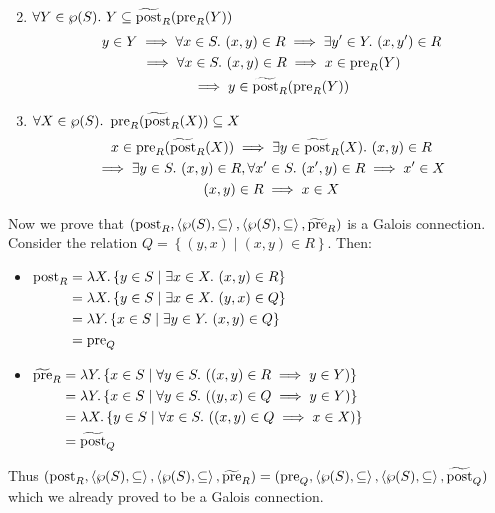\begin{exercise}
\begin{enumerate}[1.]
\begin{gather*}
        \end{gather*}
        \item $\forall Y \in \wp(S).\ Y \subseteq \widetilde{\operatorname{post}}_R(\operatorname{pre}_R(Y))$
        \begin{gather*}
            y \in Y \implies \forall x \in S.\ (x, y) \in R \implies \exists y' \in Y.\ (x, y') \in R \\
            \implies \forall x \in S.\ (x, y) \in R \implies x \in \operatorname{pre}_R(Y) \\
            \implies y \in \widetilde{\operatorname{post}}_R(\operatorname{pre}_R(Y))
        \end{gather*}
        \item $\forall X \in \wp(S).\ \pre_R(\widetilde{\post}_R(X)) \subseteq X$
        \begin{gather*}
            x \in \pre_R(\widetilde{\post}_R(X)) \implies \exists y \in \widetilde{\post}_R(X).\ (x, y) \in R \\
            \implies \exists y \in S.\ (x, y) \in R, \forall x' \in S.\ (x', y) \in R \implies x' \in X \\
            (x, y) \in R \implies x \in X
        \end{gather*}
    \end{enumerate}
    Now we prove that $(\operatorname{post}_R, \left<\wp(S), \subseteq\right>, \left<\wp(S), \subseteq\right>, \widetilde{\operatorname{pre}}_R)$ is a Galois connection. Consider the relation $Q = \left\{(y, x) \mid (x, y) \in R\right\}$. Then:
    \begin{itemize}
        \item $\!\begin{aligned}[t]
            \operatorname{post}_R
            &= \lambda X. \left\{ y \in S \mid \exists x \in X.\ (x, y) \in R \right\} \\
            &= \lambda X. \left\{ y \in S \mid \exists x \in X.\ (y, x) \in Q \right\} \\
            &= \lambda Y. \left\{ x \in S \mid \exists y \in Y.\ (x, y) \in Q \right\} \\
            &= \operatorname{pre}_Q
        \end{aligned}$
        \item $\!\begin{aligned}[t]
            \widetilde{\pre}_R
            &= \lambda Y. \left\{ x \in S \mid \forall y \in S.\ ((x, y) \in R \implies y \in Y)\right\} \\
            &= \lambda Y. \left\{ x \in S \mid \forall y \in S.\ ((y, x) \in Q \implies y \in Y)\right\} \\
            &= \lambda X. \left\{ y \in S \mid \forall x \in S.\ ((x, y) \in Q \implies x \in X)\right\} \\
            &= \widetilde{\post}_Q
        \end{aligned}$
    \end{itemize}
    Thus $(\operatorname{post}_R, \left<\wp(S), \subseteq\right>, \left<\wp(S), \subseteq\right>, \widetilde{\operatorname{pre}}_R) = (\operatorname{pre}_Q, \left<\wp(S), \subseteq\right>, \left<\wp(S), \subseteq\right>, \widetilde{\operatorname{post}}_Q)$ which we already proved to be a Galois connection.
\end{exercise}
